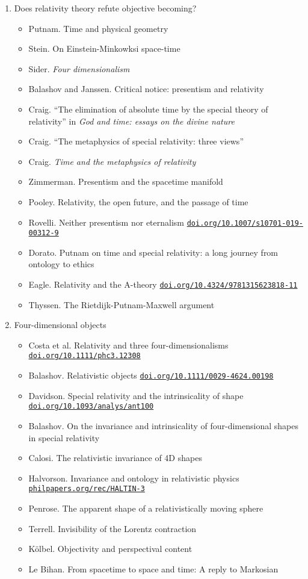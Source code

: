\documentclass[11pt]{article}
\newcommand\rurl[1]{%
  \href{http://#1}{\nolinkurl{#1}}%
}
\begin{document}
\begin{enumerate}
\item Does relativity theory refute objective becoming? 
  \begin{itemize}
  \item Putnam. Time and physical geometry
  \item Stein. On Einstein-Minkowksi space-time
  \item Sider. \emph{Four dimensionalism}
  \item Balashov and Janssen. Critical notice: presentism and
    relativity
  \item Craig. ``The elimination of absolute time by the special
    theory of relativity'' in \textit{God and time: essays on the
      divine nature}
  \item Craig. ``The metaphysics of special relativity: three views''
  \item Craig. \textit{Time and the metaphysics of relativity}
  \item Zimmerman. Presentism and the spacetime manifold
  \item Pooley. Relativity, the open future, and the passage of time
  \item Rovelli. Neither presentism nor eternalism
    \rurl{doi.org/10.1007/s10701-019-00312-9}
  \item Dorato. Putnam on time and special relativity: a long journey
    from ontology to ethics
  \item Eagle. Relativity and the A-theory
    \rurl{doi.org/10.4324/9781315623818-11}
  \item Thyssen. The Rietdijk-Putnam-Maxwell argument
  \end{itemize}


  
\item Four-dimensional objects
  \begin{itemize}
  \item Costa et al. Relativity and three four-dimensionalisms
    \rurl{doi.org/10.1111/phc3.12308}
  \item Balashov. Relativistic objects \rurl{doi.org/10.1111/0029-4624.00198}
  \item Davidson. Special relativity and the intrinsicality of
    shape \rurl{doi.org/10.1093/analys/ant100}
  \item Balashov. On the invariance and intrinsicality of
    four-dimensional shapes in special relativity
  \item Calosi. The relativistic invariance of 4D shapes
  \item Halvorson. Invariance and ontology in relativistic physics
    \rurl{philpapers.org/rec/HALTIN-3}
 \item Penrose. The apparent shape of a relativistically moving
    sphere
  \item Terrell. Invisibility of the Lorentz contraction
  \item K{\"o}lbel. Objectivity and perspectival content
  \item Le Bihan. From spacetime to space and time: A reply to
    Markosian 
  \end{itemize}


\end{enumerate}
\end{document}
